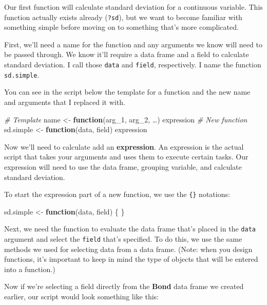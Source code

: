 \documentclass[
]{book}
\newenvironment{Shaded}{\begin{snugshade}}{\end{snugshade}}
\newcommand{\CommentTok}[1]{\textcolor[rgb]{0.56,0.35,0.01}{\textit{#1}}}
\newcommand{\ControlFlowTok}[1]{\textcolor[rgb]{0.13,0.29,0.53}{\textbf{#1}}}
\newcommand{\DecValTok}[1]{\textcolor[rgb]{0.00,0.00,0.81}{#1}}
\newcommand{\NormalTok}[1]{#1}
\newcommand{\StringTok}[1]{\textcolor[rgb]{0.31,0.60,0.02}{#1}}
\begin{document}
\begin{center}
Our first function will calculate standard deviation for a continuous variable. This function actually exists already (\texttt{?sd}), but we want to become familiar with something simple before moving on to something that's more complicated.

First, we'll need a name for the function and any arguments we know will need to be passed through. We know it'll require a data frame and a field to calculate standard deviation. I call those \texttt{data} and \texttt{field}, respectively. I name the function \texttt{sd.simple}.

You can see in the script below the template for a function and the new name and arguments that I replaced it with.

\begin{Shaded}
\begin{Highlighting}[]
\CommentTok{# Template  }
\NormalTok{name <-}\StringTok{ }\ControlFlowTok{function}\NormalTok{(arg_}\DecValTok{1}\NormalTok{, arg_}\DecValTok{2}\NormalTok{, …) expression }
\CommentTok{# New function}
\NormalTok{sd.simple <-}\StringTok{ }\ControlFlowTok{function}\NormalTok{(data, field) expression }
\end{Highlighting}
\end{Shaded}

Now we'll need to calculate add an \textbf{expression}. An expression is the actual script that takes your arguments and uses them to execute certain tasks. Our expression will need to use the data frame, grouping variable, and calculate standard deviation.

To start the expression part of a new function, we use the \texttt{\{\}} notations:

\begin{Shaded}
\begin{Highlighting}[]
\NormalTok{sd.simple <-}\StringTok{ }\ControlFlowTok{function}\NormalTok{(data, field) \{}
\NormalTok{\}}
\end{Highlighting}
\end{Shaded}

Next, we need the function to evaluate the data frame that's placed in the \texttt{data} argument and select the \texttt{field} that's specified. To do this, we use the same methods we used for selecting data from a data frame. (Note: when you design functions, it's important to keep in mind the type of objects that will be entered into a function.)

Now if we're selecting a field directly from the \textbf{Bond} data frame we created earlier, our script would look something like this:


\end{center}
\end{document}
